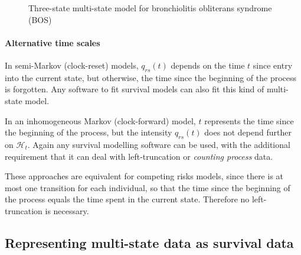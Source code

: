 \documentclass[nojss,nofooter]{jss}
\begin{document}
\begin{figure}
  \centering
  \caption{Three-state multi-state model for bronchiolitis obliterans syndrome (BOS)}
  \label{fig:bosmsm}
\end{figure}

\paragraph{Alternative time scales} 

In semi-Markov (clock-reset) models, $q_{rs}(t)$ depends on the time
$t$ since entry into the current state, but otherwise, the time since
the beginning of the process is forgotten.  Any software to fit
survival models can also fit this kind of multi-state model.

In an inhomogeneous Markov (clock-forward) model, $t$ represents the
time since the beginning of the process, but the intensity $q_{rs}(t)$
does not depend further on $\mathcal{H}_t$.  Again any survival
modelling software can be used, with the additional requirement that
it can deal with left-truncation or \emph{counting process} data.

These approaches are equivalent for competing risks models, since
there is at most one transition for each individual, so that the time
since the beginning of the process equals the time spent in the
current state.  Therefore no left-truncation is necessary.

\subsection{Representing multi-state data as survival data}
\end{document}
